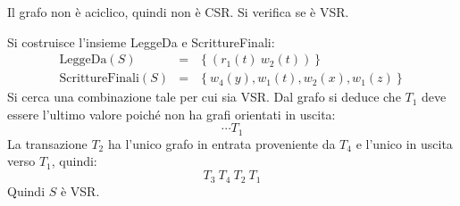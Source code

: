 \documentclass[a4paper]{article}
\begin{document}
	\noindent
	Il grafo non è aciclico, quindi non è CSR. Si verifica se è VSR.\newline

	\noindent
	Si costruisce l'insieme LeggeDa e ScrittureFinali:
	\begin{equation*}
		\begin{array}{lll}
			\text{LeggeDa}\left(S\right) 			&=& \left\{\left(r_{1}\left(t\right) \: w_{2}\left(t\right)\right)\right\} \\
			\text{ScrittureFinali}\left(S\right)	&=& \left\{w_{4}\left(y\right), w_{1}\left(t\right), w_{2}\left(x\right), w_{1}\left(z\right)\right\}
		\end{array}
	\end{equation*}
	Si cerca una combinazione tale per cui sia VSR. Dal grafo si deduce che $T_{1}$ deve essere l'ultimo valore poiché non ha grafi orientati in uscita:
	\begin{equation*}
		\cdots T_{1}
	\end{equation*}
	La transazione $T_{2}$ ha l'unico grafo in entrata proveniente da $T_{4}$ e l'unico in uscita verso $T_{1}$, quindi:
	\begin{equation*}
		T_{3} \: T_{4} \: T_{2} \: T_{1}
	\end{equation*}
	Quindi $S$ è VSR.
\end{document}
